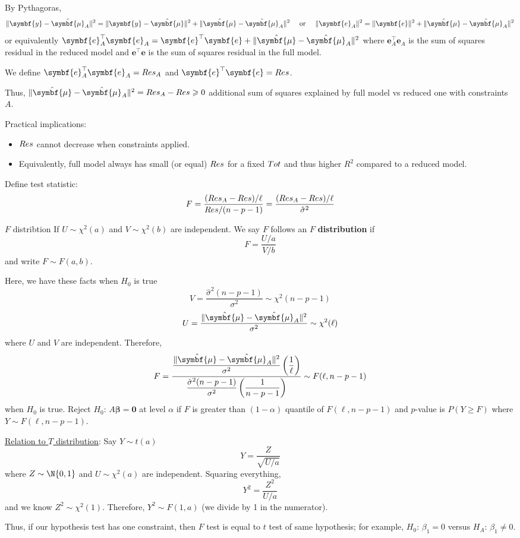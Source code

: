By Pythagoras,
\[ \norm{\symbf{y}-\hat{\symbf{\mu}}_A}^2=
    \norm{\symbf{y}-\hat{\symbf{\mu}}}^2+
    \norm{\hat{\symbf{\mu}}-\hat{\symbf{\mu}}_A}^2
    \quad\text{ or }\quad
    \norm{\symbf{e}_A}^2=\norm{\symbf{e}}^2+\norm{\hat{\symbf{\mu}}-
        \hat{\symbf{\mu}}_A
    }^2 \]
or equivalently $ \symbf{e}_A^\top \symbf{e}_A=\symbf{e}^\top \symbf{e}
    +\norm{\hat{\symbf{\mu}}-
        \hat{\symbf{\mu}}_A
    }^2 $
where $ \symbf{e}_A^\top \symbf{e}_A $ is the sum of squares
residual in the reduced model and $ \symbf{e}^\top \symbf{e} $
is the sum of squares residual in the full model.

We define $ \symbf{e}_A^\top \symbf{e}_A=\SS{Res}_A $
and $ \symbf{e}^\top \symbf{e} =\SS{Res} $.

Thus, $ \norm{\hat{\symbf{\mu}}-\hat{\symbf{\mu}}_A}^2=
    \SS{Res}_A-\SS{Res} \geqslant 0 $
additional sum of squares explained by full model vs reduced
one with constraints $ A $.

Practical implications:
\begin{itemize}
    \item $ \relax{Res} $ cannot decrease when constraints applied.
    \item Equivalently, full model always has small (or equal)
          $ \relax{Res} $ for a fixed $ \relax{Tot} $
          and thus higher $ R^2 $ compared to a reduced model.
\end{itemize}

Define test statistic:
\[ F=\frac{(\relax{Res}_A-\relax{Res})/\ell}{\relax{Res}/(n-p-1)}=
    \frac{(\relax{Res}_A-\relax{Res})/\ell}{\hat{\sigma}^2}  \]
\begin{Definition}{$F$ distribtion}{}
    If $ U \sim \chi^2(a) $ and $ V \sim \chi^2(b) $
    are independent. We say $ F $ follows an
    $ F $ \textbf{distribution} if
    \[ F=\frac{U/a}{V/b} \]
    and write $ F \sim F(a,b) $.
\end{Definition}
Here, we have these facts when $ H_0 $ is true
\[ V=\frac{\hat{\sigma}^2(n-p-1)}{\sigma^2}\sim \chi^2(n-p-1)  \]
\[ U=\frac{\norm{\hat{\symbf{\mu}}-\hat{\symbf{\mu}}_A}^2}{\sigma^2}\sim \chi^2(\ell)  \]
where $ U $ and $ V $ are independent. Therefore,
\[ F=\dfrac{\dfrac{\norm{\hat{\symbf{\mu}}-\hat{\symbf{\mu}}_A}^2}{\sigma^2}
        \left( \dfrac{1}{\ell} \right)}{\dfrac{\hat{\sigma}^2(n-p-1)}{\sigma^2}
        \left( \dfrac{1}{n-p-1} \right)} \sim F(\ell,n-p-1)   \]
when $ H_0 $ is true. Reject
$ H_0 $: $ A\symbf{\beta}=\symbf{0} $ at level $ \alpha $
if $ F $ is greater than $ (1-\alpha) $
quantile of $ F(\ell,n-p-1) $
and $ p $-value is $ P(Y\geqslant F) $ where $ Y \sim F(\ell,n-p-1) $.

\underline{Relation to $ T $ distribution}:
Say $ Y \sim t(a) $
\[ Y=\frac{Z}{\sqrt{U/a}}  \]
where $ Z \sim \N{0,1} $
and $ U \sim \chi^2(a) $ are independent.
Squaring everything,
\[ Y^2=\frac{Z^2}{U/a} \]
and we know $ Z^2 \sim \chi^2(1) $. Therefore,
$ Y^2 \sim F(1,a) $ (we divide by 1 in the numerator).

Thus, if our hypothesis test has one constraint,
then $ F $ test is equal to $ t $ test of same hypothesis;
for example, $ H_0 $: $ \beta_1=0 $ versus $ H_A $: $ \beta_1\neq 0 $.
